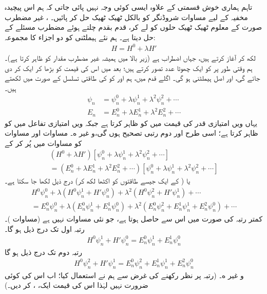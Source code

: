 تاہم ہماری خوش قسمتی کے علاوہ ایسی کوئی وجہ نہیں پائی جاتی کہ ہم اس پیچیدہ مخفیہ کے لیے مساوات شروڈنگر کو بالکل ٹھیک ٹھیک حل کر پائیں۔ ، غیر مضطرب صورت کے معلوم ٹھیک ٹھیک حلوں کو لے کر، قدم بقدم چلتے ہوئے مضطرب مسئلے کے  حل دیتا ہے۔ ہم نئے ہیملٹنی کو دو اجزاء کا مجموعہ:
\begin{align}
H = H^0 + \lambda H'
\end{align}
 لکھ کر آغاز کرتے ہیں، جہاں  اضطراب ہے (زیر بالا میں  ہمیشہ غیر مضطرب مقدار کو ظاہر کرتا ہے)۔ ہم وقتی طور پر  کو ایک چھوٹا عدد تصور کرتے ہیں؛ بعد میں اس کی قیمت کو بڑھا کر ایک  کر دی جائے گی، اور  اصل ہیملٹنی ہو گی۔ اگلے قدم میں، ہم  اور  کو  کی طاقتی تسلسل کے صورت میں لکھتے ہیں۔
\begin{align}
\psi_n &= \psi_n^0 + \lambda\psi_n^1 + \lambda^2\psi_n^2+\cdots \label{مساوات_اضطراب_سائے_این}\\
E_n &= E_n^0 + \lambda E_n^1 + \lambda^2 E_n^2+\cdots \label{مساوات_اضطراب_ای_این}
\end{align} 
یہاں  ویں امتیازی قدر کی قیمت میں  کو  ظاہر کرتا ہے جبکہ  ویں امتیازی تفاعل میں  کو  ظاہر کرتا ہے؛ اسی طرح  اور  دوم رتبی تصحیح ہوں گی،و غیر ه۔ مساوات  اور مساوات  کو مساوات  میں پُر کر کے 
\begin{multline*}
(H^0 + \lambda H')[\psi_n^0 + \lambda \psi_n^1 + \lambda^2 \psi_n^2 + \cdots]\\
= (E_n^0 + \lambda E_n^1 + \lambda^2 E_n^2 + \cdots)[\psi_n^0 + \lambda \psi_n^1 + \lambda^2 \psi_n^2 + \cdots]
\end{multline*}
یا (  کے ایک جیسے طاقتوں کو اکٹھا لکھ کر) درج ذیل لکھا جا سکتا ہے۔
\begin{multline*}
H^0 \psi_n^0 + \lambda (H^0 \psi_n^1 + H' \psi_n^0) + \lambda^2 (H^0 \psi_n^2 + H' \psi_n^1) + \cdots \\
= E_n^0 \psi_n^0 + \lambda (E_n^0 \psi_n^1 + E_n^1 \psi_n^0) + \lambda^2 (E_n^0 \psi_n^2 + E_n^1 \psi_n^1 + E_n^2 \psi_n^0) + \cdots
\end{multline*}
 کمتر رتبہ  کی صورت میں اس سے  حاصل ہوتا ہے، جو نئی مساوات نہیں ہے (مساوات )۔ رتبہ اول  تک درج ذیل ہو گا۔
\begin{align}\label{مساوات_اضطراب_رتبہ_اول}
H^0 \psi_n^1 + H' \psi_n^0 = E_n^0 \psi_n^1 + E_n^1 \psi_n^0
\end{align}
رتبہ دوم  تک درج ذیل ہو گا 
\begin{align}\label{مساوات_اضطراب_رتبہ_دوم}
H^0 \psi_n^2 + H' \psi_n^1 = E_n^0 \psi_n^2 + E_n^1 \psi_n^1 + E_n^2 \psi_n^0
\end{align}
و غیر ه۔ (رتبہ پر نظر رکھنے کی غرض سے ہم نے  استعمال کیا؛ اب اس کی کوئی ضرورت نہیں لہٰذا اس کی قیمت ایک، ، کر دیں۔)

